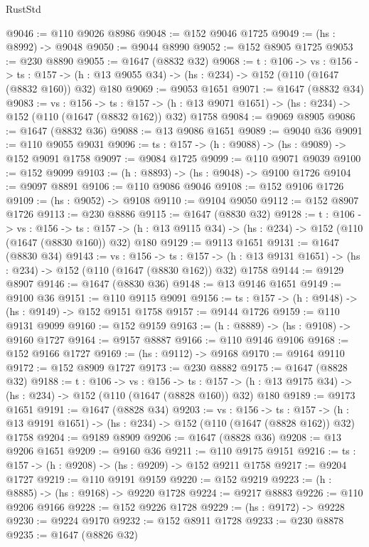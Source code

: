 \begin{lexlean}{RustStd}
\begin{coremodule}
@9046 := @110 @9026 @8986
@9048 := @152 @9046 @1725
@9049 := (hs : @8992) -> @9048
@9050 := @9044 @8990
@9052 := @152 @8905 @1725
@9053 := @230 @8890
@9055 := @1647 (@8832 @32)
@9068 := {t : @106} ->
  {vs : @156} ->
  {ts : @157} -> (h : @13 @9055 @34) -> (hs : @234) -> @152 (@110 (@1647 (@8832 @160)) @32) @180
@9069 := @9053 @1651
@9071 := @1647 (@8832 @34)
@9083 := {vs : @156} ->
  {ts : @157} -> (h : @13 @9071 @1651) -> (hs : @234) -> @152 (@110 (@1647 (@8832 @162)) @32) @1758
@9084 := @9069 @8905
@9086 := @1647 (@8832 @36)
@9088 := @13 @9086 @1651
@9089 := @9040 @36
@9091 := @110 @9055 @9031
@9096 := {ts : @157} -> (h : @9088) -> (hs : @9089) -> @152 @9091 @1758
@9097 := @9084 @1725
@9099 := @110 @9071 @9039
@9100 := @152 @9099
@9103 := (h : @8893) -> (hs : @9048) -> @9100 @1726
@9104 := @9097 @8891
@9106 := @110 @9086 @9046
@9108 := @152 @9106 @1726
@9109 := (hs : @9052) -> @9108
@9110 := @9104 @9050
@9112 := @152 @8907 @1726
@9113 := @230 @8886
@9115 := @1647 (@8830 @32)
@9128 := {t : @106} ->
  {vs : @156} ->
  {ts : @157} -> (h : @13 @9115 @34) -> (hs : @234) -> @152 (@110 (@1647 (@8830 @160)) @32) @180
@9129 := @9113 @1651
@9131 := @1647 (@8830 @34)
@9143 := {vs : @156} ->
  {ts : @157} -> (h : @13 @9131 @1651) -> (hs : @234) -> @152 (@110 (@1647 (@8830 @162)) @32) @1758
@9144 := @9129 @8907
@9146 := @1647 (@8830 @36)
@9148 := @13 @9146 @1651
@9149 := @9100 @36
@9151 := @110 @9115 @9091
@9156 := {ts : @157} -> (h : @9148) -> (hs : @9149) -> @152 @9151 @1758
@9157 := @9144 @1726
@9159 := @110 @9131 @9099
@9160 := @152 @9159
@9163 := (h : @8889) -> (hs : @9108) -> @9160 @1727
@9164 := @9157 @8887
@9166 := @110 @9146 @9106
@9168 := @152 @9166 @1727
@9169 := (hs : @9112) -> @9168
@9170 := @9164 @9110
@9172 := @152 @8909 @1727
@9173 := @230 @8882
@9175 := @1647 (@8828 @32)
@9188 := {t : @106} ->
  {vs : @156} ->
  {ts : @157} -> (h : @13 @9175 @34) -> (hs : @234) -> @152 (@110 (@1647 (@8828 @160)) @32) @180
@9189 := @9173 @1651
@9191 := @1647 (@8828 @34)
@9203 := {vs : @156} ->
  {ts : @157} -> (h : @13 @9191 @1651) -> (hs : @234) -> @152 (@110 (@1647 (@8828 @162)) @32) @1758
@9204 := @9189 @8909
@9206 := @1647 (@8828 @36)
@9208 := @13 @9206 @1651
@9209 := @9160 @36
@9211 := @110 @9175 @9151
@9216 := {ts : @157} -> (h : @9208) -> (hs : @9209) -> @152 @9211 @1758
@9217 := @9204 @1727
@9219 := @110 @9191 @9159
@9220 := @152 @9219
@9223 := (h : @8885) -> (hs : @9168) -> @9220 @1728
@9224 := @9217 @8883
@9226 := @110 @9206 @9166
@9228 := @152 @9226 @1728
@9229 := (hs : @9172) -> @9228
@9230 := @9224 @9170
@9232 := @152 @8911 @1728
@9233 := @230 @8878
@9235 := @1647 (@8826 @32)

\end{coremodule}
\end{lexlean}
